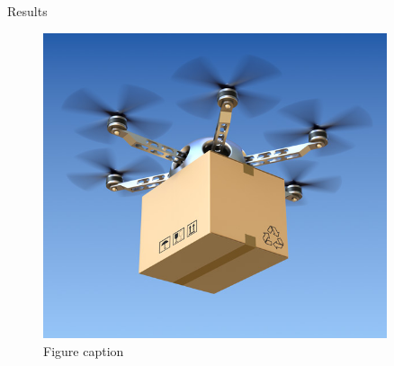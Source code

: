 \documentclass[final]{beamer}
\newlength{\sepwid}
\newlength{\onecolwid}
\newlength{\twocolwid}
\begin{document}
\begin{frame}[t]
\begin{columns}[t]
\begin{column}{\twocolwid}







\end{column} %

\begin{column}{\sepwid}\end{column} %

\begin{column}{\onecolwid} %


\begin{block}{Results}




\begin{figure}
\includegraphics[width=0.8\linewidth]{images/delivery-drone.jpg}
\caption{Figure caption}
\end{figure}


\end{block}
\end{column}
\end{columns}
\end{frame}
\end{document}
